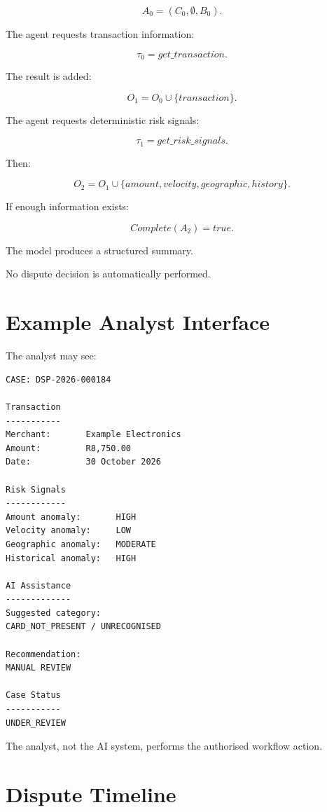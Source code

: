 \documentclass[11pt,a4paper]{article}
\begin{document}
\[
A_0=(C_0,\emptyset,B_0).
\]

The agent requests transaction information:

\[
\tau_0=get\_transaction.
\]

The result is added:

\[
O_1=O_0\cup\{transaction\}.
\]

The agent requests deterministic risk signals:

\[
\tau_1=get\_risk\_signals.
\]

Then:

\[
O_2
=
O_1
\cup
\{
amount,
velocity,
geographic,
history
\}.
\]

If enough information exists:

\[
Complete(A_2)=true.
\]

The model produces a structured summary.

No dispute decision is automatically performed.

\section{Example Analyst Interface}

The analyst may see:

\begin{lstlisting}
CASE: DSP-2026-000184

Transaction
-----------
Merchant:       Example Electronics
Amount:         R8,750.00
Date:           30 October 2026

Risk Signals
------------
Amount anomaly:       HIGH
Velocity anomaly:     LOW
Geographic anomaly:   MODERATE
Historical anomaly:   HIGH

AI Assistance
-------------
Suggested category:
CARD_NOT_PRESENT / UNRECOGNISED

Recommendation:
MANUAL REVIEW

Case Status
-----------
UNDER_REVIEW
\end{lstlisting}

The analyst, not the AI system, performs the authorised workflow action.

\section{Dispute Timeline}
\end{document}
